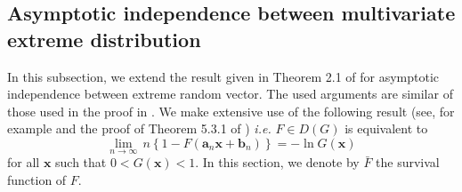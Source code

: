 \documentclass[11pt]{article}
\begin{document}
	\subsection{Asymptotic independence between multivariate extreme distribution}
	\label{subsec:asympto_indep}
	In this subsection, we extend the result given in Theorem 2.1 of \cite{takahashi1994asymptotic} for asymptotic independence between extreme random vector. The used arguments are similar of those used in the proof in \cite{takahashi1994asymptotic}. We make extensive use of the following result (see, for example \cite{10.1214/aop/1176993666} and the proof of Theorem 5.3.1 of \cite{galambos1978asymptotic}) \emph{i.e.} $F \in D(G)$ is equivalent to
	\begin{equation}
		\label{eq:app_galambos}
		\underset{n \rightarrow \infty}{\lim} \, n \left\{ 1 - F(\textbf{a}_n \textbf{x} + \textbf{b}_n) \right\} = - \ln G(\textbf{x})
	\end{equation}
	for all $\textbf{x}$ such that $0<G(\textbf{x}) <1$. In this section, we denote by $\bar{F}$ the survival function of $F$.
	
\end{document}
